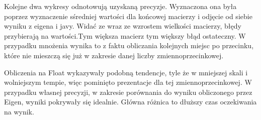 \documentclass[8pt]{article}
\begin{document}
Kolejne dwa wykresy odnotowują uzyskaną precyzje. Wyznaczona ona była poprzez wyznaczenie sśredniej wartości dla końcowej macierzy i odjęcie od siebie wyniku z eigena i javy. Widać ze wraz ze wzrostem wielkości macierzy, błędy przybierają na wartości.Tym większa macierz tym większy błąd ostateczny. W przypadku mnożenia wynika to z faktu obliczania kolejnych miejsc po przecinku, które nie mieszczą się już w zakresie danej liczby zmiennoprzecinkowej. \\
\begin{center}
\end{center}  

Obliczenia na Float wykazywały podobną tendencje, tyle że w mniejszej skali i wolniejszym tempie, więc pominięto prezentacje dla tej zmiennoprzecinkowej.
W przypadku własnej precyzji, w zakresie porównania do wyniku obliczonego przez Eigen, wyniki pokrywały się idealnie. Główna różnica to dłuższy czas oczekiwania na wynik.

\begin{center}
\end{center}
\end{document}
